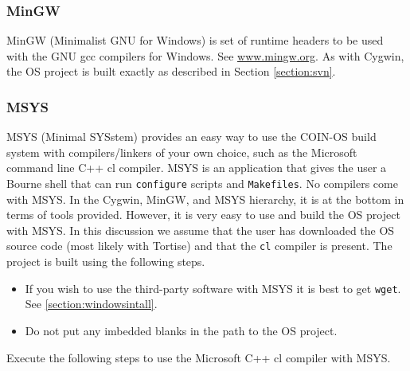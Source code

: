 \documentclass[11pt]{article}
\renewcommand{\_}{{\char"5F}}
\renewcommand{\{}{{\char"7B}}
\renewcommand{\}}{{\char"7D}}
\renewcommand{\^}{{\char"0D}}
\renewcommand{\'}{{\char"0D}}
\begin{document}
\subsubsection{MinGW}



MinGW (Minimalist GNU for Windows) is set of runtime headers to be used with the GNU gcc compilers for Windows.  See \url{www.mingw.org}. As with Cygwin, the OS project is  built exactly as described in Section \ref{section:svn}.

\subsubsection{MSYS}



MSYS (Minimal SYSstem) provides an easy way to use the COIN-OS build system with compilers/linkers of your own choice, such as the Microsoft command line C++ cl compiler.  MSYS is an application that gives the user a Bourne shell that can run {\tt configure}  scripts and {\tt Makefiles}.  No compilers come with MSYS. In the Cygwin, MinGW, and MSYS hierarchy, it is at the bottom in terms of tools provided. However, it is very easy to use and build the OS project with MSYS.    In this discussion we assume that the user has downloaded the OS source code (most likely  with Tortise) and that the {\tt cl} compiler is present.  The project is built using the following steps.

\vskip 8pt


\begin{itemize}

\item If you wish to use the third-party software with MSYS it is best to get {\tt wget}. See \ref{section:windowsintall}.

 \item Do not put any imbedded blanks in the path to the OS project.
 \end{itemize}



Execute the following steps to use the Microsoft C++ cl compiler with MSYS.
\end{document}
